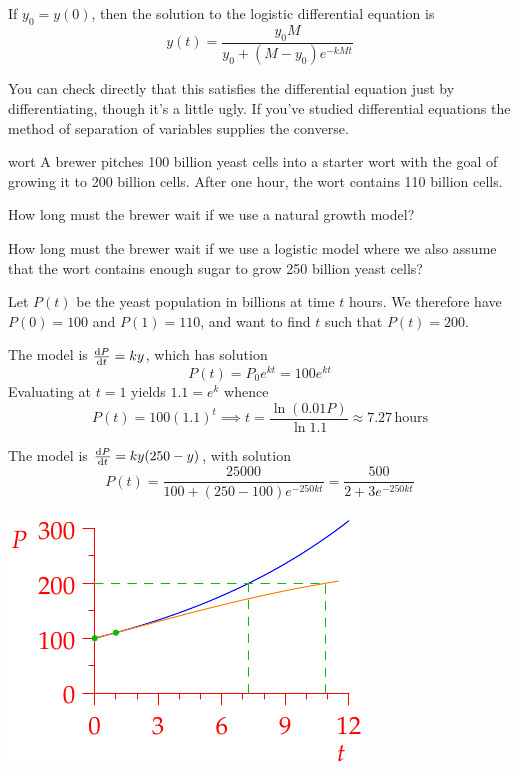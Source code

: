 \begin{thm}{}{}
If $y_0=y(0)$, then the solution to the logistic differential equation is
\[y(t)=\frac{y_0M}{y_0+(M-y_0)e^{-kMt}}\]
\end{thm}

You can check directly that this satisfies the differential equation just by differentiating, though it's a little ugly. If you've studied differential equations the method of separation of variables supplies the converse.

\begin{example}{}{wort}
A brewer pitches 100 billion yeast cells into a starter wort with the goal of growing it to 200 billion cells. After one hour, the wort contains 110 billion cells.
\begin{enumeratea}
  \item How long must the brewer wait if we use a natural growth model?
  \item How long must the brewer wait if we use a logistic model where we also assume that the wort contains enough sugar to grow 250 billion yeast cells?
\end{enumeratea}

Let $P(t)$ be the yeast population in billions at time $t$ hours. We therefore have $P(0)=100$ and $P(1)=110$, and want to find $t$ such that $P(t)=200$.
\begin{enumeratea}
  \begin{minipage}[t]{0.6\linewidth}\vspace{0pt}
  \item The model is $\diff[P]{t}=ky$, which has solution
  \[P(t)=P_0e^{kt}=100e^{kt}\]
  Evaluating at $t=1$ yields $1.1=e^k$ whence
  \[P(t)=100(1.1)^t\implies t=\frac{\ln(0.01 P)}{\ln 1.1}\approx 7.27\,\text{hours}\]
	\item The model is $\diff[P]{t}=ky(250-y)$, with solution
	\[P(t)=\frac{25000}{100+(250-100)e^{-250kt}} =\frac{500}{2+3e^{-250kt}}\]
  \end{minipage}\begin{minipage}[t]{0.4\linewidth}\vspace{0pt}
  \flushright\includegraphics{wort}
  \end{minipage}\smallbreak
  

\end{enumeratea}
\end{example}
